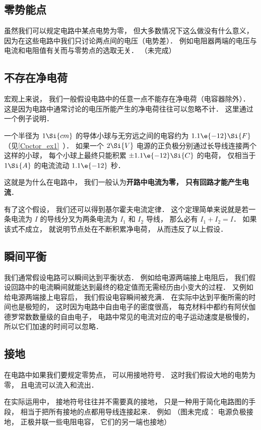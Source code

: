 

\subsection{零势能点}
虽然我们可以规定电路中某点电势为零， 但大多数情况下这么做没有什么意义， 因为在这些电路中我们只讨论两点间的电压（电势差）． 例如电阻器两端的电压与电流和电阻值有关而与零势点的选取无关．
（未完成）

\subsection{不存在净电荷}
宏观上来说， 我们一般假设电路中的任意一点不能存在净电荷（电容器除外）． 这是因为电路中通常讨论的电压所能产生的净电荷往往可以忽略不计． 这里通过一个例子说明．

\begin{example}{}
一个半径为 $1\Si{cm}$ 的导体小球与无穷远之间的电容约为 $1.1\e{-12} \Si{F}$（见\autoref{Cpctor_ex1}~）． 如果一个 $2\Si{V}$ 电源的正负极分别通过长导线连接两个这样的小球， 每个小球上最终只能积累 $\pm 1.1\e{-12} \Si{C}$ 的电荷， 仅相当于 $1\Si{A}$ 的电流流动 $1.1\e{-12}$ 秒．
\end{example}
这就是为什么在电路中， 我们一般认为\textbf{开路中电流为零， 只有回路才能产生电流}．

有了这个假设， 我们还可以得到基尔霍夫电流定律． 这个定理简单来说就是若一条电流为 $I$ 的导线分叉为两条电流为 $I_1$ 和 $I_2$ 导线， 那么必有 $I_1 + I_2 = I$． 如果该式不成立， 就说明节点处在不断积累净电荷， 从而违反了以上假设．

\subsection{瞬间平衡}
我们通常假设电路可以瞬间达到平衡状态． 例如给电源两端接上电阻后， 我们假设回路中的电流瞬间就能达到最终的稳定值而无需经历由小变大的过程． 又例如给电源两端接上电容后， 我们假设电容瞬间被充满． 在实际中达到平衡所需的时间也是极短的， 这时因为电路中自由电子的密度很高， 每克材料中都约有阿伏伽德罗常数数量级的自由电子， 电路中常见的电流对应的电子运动速度是极慢的， 所以它们加速的时间可以忽略．

\subsection{接地}
在电路中如果我们要规定零势点， 可以用接地符号． 这时我们假设大地的电势为零， 且电流可以流入和流出．

在实际运用中， 接地符号往往并不需要真的接地， 只是一种用于简化电路图的手段， 相当于把所有接地的点都用导线连接起来． 例如
（图未完成： 电源负极接地， 正极并联一些电阻电容， 它们的另一端也接地）
